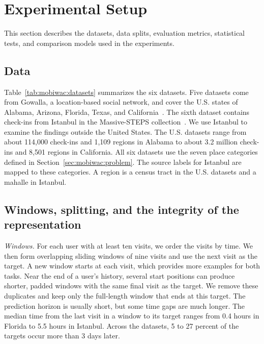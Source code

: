 \section{Experimental Setup}
\label{sec:mobiwac:setup}

This section describes the datasets, data splits, evaluation metrics, statistical tests, and comparison models used in the experiments.

\subsection{Data}
\label{sec:mobiwac:setup-data}
Table~\ref{tab:mobiwac:datasets} summarizes the six datasets. Five datasets come from Gowalla, a location-based social network, and cover the U.S. states of Alabama, Arizona, Florida, Texas, and California~\cite{cho2011gowalla}. The sixth dataset contains check-ins from Istanbul in the Massive-STEPS collection~\cite{wongso2025massivesteps}. We use Istanbul to examine the findings outside the United States.
The U.S. datasets range from about 114,000 check-ins and 1,109 regions in Alabama to about 3.2 million check-ins and 8,501 regions in California. All six datasets use the seven place categories defined in Section~\ref{sec:mobiwac:problem}. The source labels for Istanbul are mapped to these categories. A region is a census tract in the U.S. datasets and a mahalle in Istanbul.



\subsection{Windows, splitting, and the integrity of the representation}
\label{sec:mobiwac:setup-windows}
\emph{Windows.} For each user with at least ten visits, we order the visits by time. We then form overlapping sliding windows of nine visits and use the next visit as the target. A new window starts at each visit, which provides more examples for both tasks. Near the end of a user's history, several start positions can produce shorter, padded windows with the same final visit as the target. We remove these duplicates and keep only the full-length window that ends at this target. The prediction horizon is usually short, but some time gaps are much longer. The median time from the last visit in a window to its target ranges from 0.4 hours in Florida to 5.5 hours in Istanbul. Across the datasets, 5 to 27 percent of the targets occur more than 3 days later.

